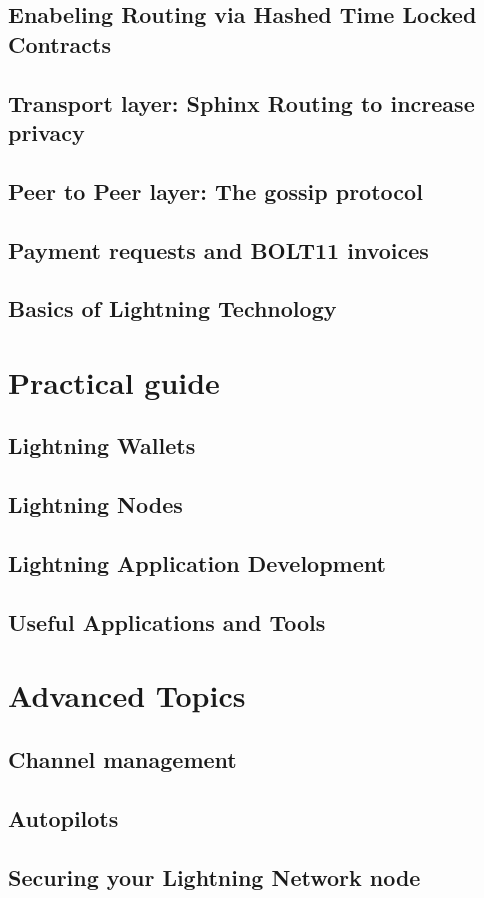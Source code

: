 \documentclass[a4paper,12pt,oneside,openany]{book}
\begin{document}
\section{Enabeling Routing via Hashed Time Locked Contracts}
\section{Transport layer: Sphinx Routing to increase privacy}
\section{Peer to Peer layer: The gossip protocol}
\section{Payment requests and BOLT11 invoices}
\section{Basics of Lightning Technology}
\chapter{Practical guide}
\section{Lightning Wallets}
\section{Lightning Nodes}
\section{Lightning Application Development}
\section{Useful Applications and Tools}
\chapter{Advanced Topics}
\section{Channel management}
\section{Autopilots}
\section{Securing your Lightning Network node}
\end{document}
